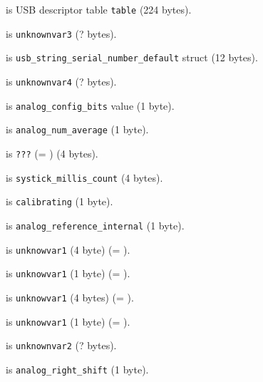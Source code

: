  is USB descriptor table \texttt{table} (224 bytes).

 is \texttt{unknownvar3} (? bytes).

 is {\tiny
\texttt{usb\_string\_serial\_number\_default}} struct (12 bytes).

 is \texttt{unknownvar4} (? bytes).

 is \texttt{analog\_config\_bits} value (1 byte).

 is \texttt{analog\_num\_average} (1 byte).

 is \texttt{???} (= ) (4 bytes).

 is \texttt{systick\_millis\_count} (4 bytes).

 is \texttt{calibrating} (1 byte).

 is \texttt{analog\_reference\_internal} (1 byte).

 is \texttt{unknowvar1} (4 byte) (= ).

 is \texttt{unknowvar1} (1 byte) (= ).

 is \texttt{unknowvar1} (4 bytes) (= ).

 is \texttt{unknowvar1} (1 byte) (= ).

 is \texttt{unknownvar2} (? bytes).

 is \texttt{analog\_right\_shift} (1 byte).
